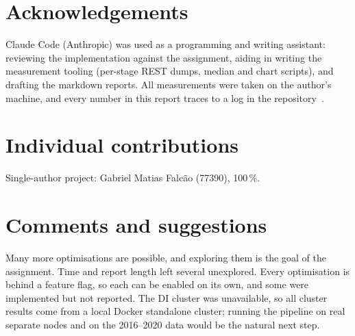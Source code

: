 \documentclass[sigconf]{acmart}
\begin{document}
\clearpage




\section*{Acknowledgements}
Claude Code (Anthropic) was used as a programming and writing assistant:
reviewing the implementation against the assignment, aiding in writing the measurement tooling
(per-stage REST dumps, median and chart scripts), and drafting the markdown reports.
All measurements were taken on the author's machine, and every number in this report traces to
a log in the repository~\cite{repo}.

\section*{Individual contributions}
Single-author project: Gabriel Matias Falcão (77390), 100\,\%.

\section*{Comments and suggestions}

Many more optimisations are possible, and exploring them is the goal of the
assignment. Time and report length left several unexplored. Every optimisation
is behind a feature flag, so each can be enabled on its own, and some were
implemented but not reported. The DI cluster was unavailable, so all cluster
results come from a local Docker standalone cluster; running the pipeline on
real separate nodes and on the 2016--2020 data would be the natural next step.

\printglossary[type=\acronymtype,title={Acronyms}]
\end{document}
